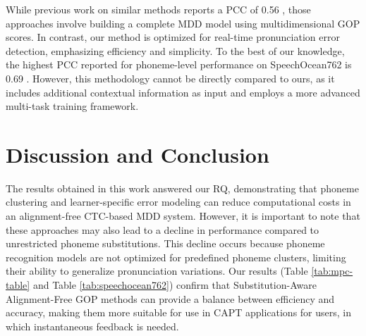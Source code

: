 \documentclass{Interspeech}
\begin{document}
While previous work on similar methods reports a PCC of 0.56 \cite{cao2024framework}, those approaches involve building a complete MDD model using multidimensional GOP scores. In contrast, our method is optimized for real-time pronunciation error detection, emphasizing efficiency and simplicity. To the best of our knowledge, the highest PCC reported for phoneme-level performance on SpeechOcean762 is 0.69 \cite{chao2023hierarchical}. However, this methodology cannot be directly compared to ours, as it includes additional contextual information as input and employs a more advanced multi-task training framework.



\section{Discussion and Conclusion}


The results obtained in this work answered our RQ, demonstrating that phoneme clustering and learner-specific error modeling can reduce computational costs in an alignment-free CTC-based MDD system. However, it is important to note that these approaches may also lead to a decline in performance compared to unrestricted phoneme substitutions.
This decline occurs because phoneme recognition models are not optimized for predefined phoneme clusters, limiting their ability to generalize pronunciation variations. 
%
Our results (Table \ref{tab:mpc-table} and Table \ref{tab:speechocean762}) confirm that Substitution-Aware Alignment-Free GOP methods can provide a balance between efficiency and accuracy, making them more suitable for use in CAPT applications for users, in which instantaneous feedback is needed.  


\end{document}
